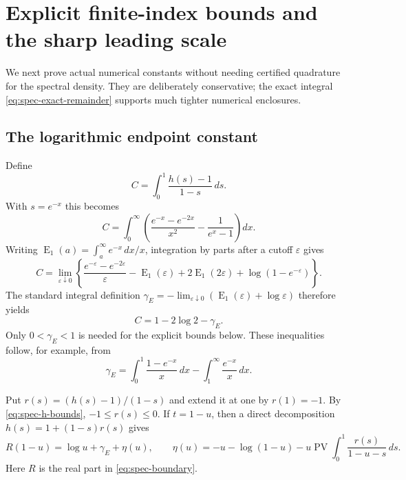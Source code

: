 \section{Explicit finite-index bounds and the sharp leading scale}
\label{sec:spectral-bounds-notes}

We next prove actual numerical constants without needing certified
quadrature for the spectral density.  They are deliberately conservative;
the exact integral \eqref{eq:spec-exact-remainder} supports much tighter
numerical enclosures.

\subsection{The logarithmic endpoint constant}

Define
\[
 C=\int_0^1\frac{h(s)-1}{1-s}\,ds.
\]
With $s=e^{-x}$ this becomes
\[
 C=\int_0^\infty\left(
       \frac{e^{-x}-e^{-2x}}{x^2}-\frac1{e^x-1}\right)dx.
\]
Writing $\operatorname{E}_1(a)=\int_a^\infty e^{-x}\,dx/x$,
integration by parts after a cutoff $\varepsilon$ gives
\[
 C=\lim_{\varepsilon\downarrow0}
 \left\{
 \frac{e^{-\varepsilon}-e^{-2\varepsilon}}\varepsilon
 -\operatorname{E}_1(\varepsilon)
 +2\operatorname{E}_1(2\varepsilon)
 +\log(1-e^{-\varepsilon})\right\}.
\]
The standard integral definition
$\gamma_{\!E}=-\lim_{\varepsilon\downarrow0}
 (\operatorname{E}_1(\varepsilon)+\log\varepsilon)$ therefore yields
\begin{equation}
 C=1-2\log2-\gamma_{\!E}.
 \label{eq:spec-Cconstant}
\end{equation}
Only $0<\gamma_{\!E}<1$ is needed for the explicit bounds below.
These inequalities follow, for example, from
\[
 \gamma_{\!E}=\int_0^1\frac{1-e^{-x}}x\,dx
                  -\int_1^\infty\frac{e^{-x}}x\,dx.
\]

Put $r(s)=(h(s)-1)/(1-s)$ and extend it at one by $r(1)=-1$.
By \eqref{eq:spec-h-bounds}, $-1\le r(s)\le0$.  If $t=1-u$,
then a direct decomposition $h(s)=1+(1-s)r(s)$ gives
\begin{equation}
 R(1-u)=\log u+\gamma_{\!E}+\eta(u),\qquad
 \eta(u)=-u-\log(1-u)
       -u\operatorname{PV}\int_0^1\frac{r(s)}{1-u-s}\,ds.
 \label{eq:spec-etaidentity}
\end{equation}
Here $R$ is the real part in \eqref{eq:spec-boundary}.


